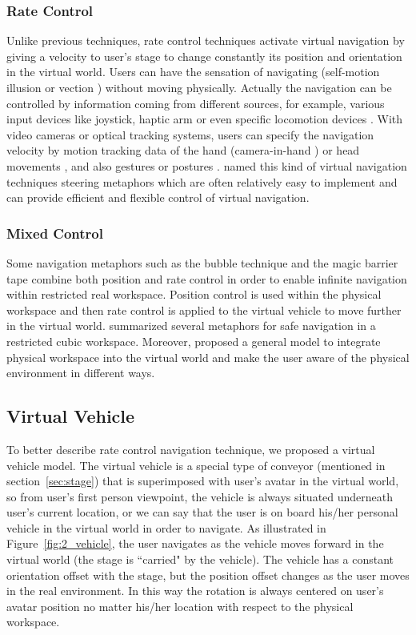 \subsubsection{Rate Control}
Unlike previous techniques, rate control techniques activate virtual navigation by giving a velocity to user's stage to change constantly its position and orientation in the virtual world. Users can have the sensation of navigating (self-motion illusion or vection \citep{Riecke2012Vection}) without moving physically. Actually the navigation can be controlled by information coming from different sources, for example, various input devices like joystick, haptic arm \citep{Martin2012Forklift} or even specific locomotion devices \citep{Marchal2011JOYMAN}. With video cameras or optical tracking systems, users can specify the navigation velocity by motion tracking data of the hand (camera-in-hand \citep{Ware1990EVC}) or head movements \citep{Bourdot2002HCNav}, and also gestures \citep{Konrad2003Gesture} or postures \citep{Kapri2011Steering}. \citet{Bowman2004UIT} named this kind of virtual navigation techniques steering metaphors which are often relatively easy to implement and can provide efficient and flexible control of virtual navigation.

\subsubsection{Mixed Control}
Some navigation metaphors such as the bubble technique \citep{Dominjon2005Bubble} and the magic barrier tape \citep{Cirio2009MBT} combine both position and rate control in order to enable infinite navigation within restricted real workspace. Position control is used within the physical workspace and then rate control is applied to the virtual vehicle to move further in the virtual world. \citet{Cirio2012Cube} summarized several metaphors for safe navigation in a restricted cubic workspace. Moreover, \citet{Fleury2010Generic} proposed a general model to integrate physical workspace into the virtual world and make the user aware of the physical environment in different ways.


\subsection{Virtual Vehicle}
To better describe rate control navigation technique, we proposed a virtual vehicle model. The virtual vehicle is a special type of conveyor (mentioned in section~\ref{sec:stage}) that is superimposed with user's avatar in the virtual world, so from user's first person viewpoint, the vehicle is always situated underneath user's current location, or we can say that the user is on board his/her personal vehicle in the virtual world in order to navigate. As illustrated in Figure~\ref{fig:2_vehicle}, the user navigates as the vehicle moves forward in the virtual world (the stage is ``carried" by the vehicle). The vehicle has a constant orientation offset with the stage, but the position offset changes as the user moves in the real environment. In this way the rotation is always centered on user's avatar position no matter his/her location with respect to the physical workspace.

